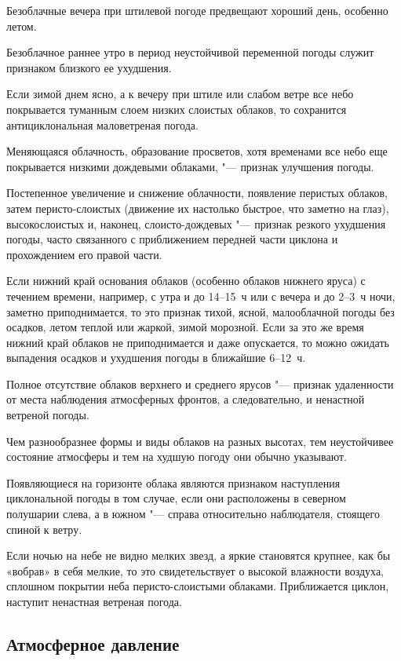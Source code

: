  Безоблачные вечера при штилевой погоде предвещают хороший день,
особенно летом.

 Безоблачное раннее утро в период неустойчивой переменной погоды
служит признаком близкого ее ухудшения.

 Если зимой днем ясно, а к вечеру при штиле или слабом ветре все
небо покрывается туманным слоем низких слоистых облаков, то сохранится
антициклональная маловетреная погода.

 Меняющаяся облачность, образование просветов, хотя временами
все небо еще покрывается низкими дождевыми облаками, "--- признак
улучшения погоды.

 Постепенное увеличение и снижение облачности, появление
перистых облаков, затем перисто-слоистых (движение их настолько
быстрое, что заметно на глаз), высокослоистых и, наконец,
слоисто-дождевых "--- признак резкого ухудшения погоды, часто
связанного с приближением передней части циклона и прохождением его
правой части.

 Если нижний край основания облаков (особенно облаков нижнего
яруса) с течением времени, например, с утра и до 14--15~ч или с вечера
и до 2--3~ч ночи, заметно приподнимается, то это признак тихой, ясной,
малооблачной погоды без осадков, летом теплой или жаркой, зимой
морозной. Если за это же время нижний край облаков не приподнимается и
даже опускается, то можно ожидать выпадения осадков и ухудшения погоды
в ближайшие 6--12~ч.

 Полное отсутствие облаков верхнего и среднего ярусов "--- признак
удаленности от места наблюдения атмосферных фронтов, а следовательно,
и ненастной ветреной погоды.

 Чем разнообразнее формы и виды облаков на разных высотах, тем
неустойчивее состояние атмосферы и тем на худшую погоду они обычно
указывают.

 Появляющиеся на горизонте облака являются признаком наступления
циклональной погоды в том случае, если они расположены в северном
полушарии слева, а в южном "--- справа относительно наблюдателя, стоящего
спиной к ветру.

 Если ночью на небе не видно мелких звезд, а яркие становятся
крупнее, как бы «вобрав» в себя мелкие, то это свидетельствует о
высокой влажности воздуха, сплошном покрытии неба перисто-слоистыми
облаками. Приближается циклон, наступит ненастная ветреная погода.

\subsection{Атмосферное давление}

